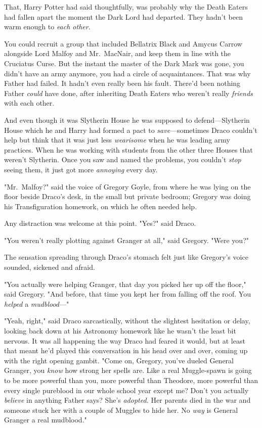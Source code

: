 That, Harry Potter had said thoughtfully, was probably why the Death Eaters had 
fallen apart the moment the Dark Lord had departed. They hadn't been warm 
enough to \emph{each other}.

You could recruit a group that included Bellatrix Black and Amycus Carrow 
alongside Lord Malfoy and Mr.~MacNair, and keep them in line with the Cruciatus 
Curse. But the instant the master of the Dark Mark was gone, you didn't have an 
army anymore, you had a circle of acquaintances. That was why Father had 
failed. It hadn't even really been his fault. There'd been nothing Father 
\emph{could} have done, after inheriting Death Eaters who weren't really 
\emph{friends} with each other.

And even though it was Slytherin House he was supposed to defend---Slytherin 
House which he and Harry had formed a pact to \emph{save}---sometimes Draco 
couldn't help but think that it was just less \emph{wearisome} when he was 
leading army practices. When he was working with students from the other three 
Houses that weren't Slytherin. Once you saw and named the problems, you 
couldn't \emph{stop} seeing them, it just got more \emph{annoying} every day.

"Mr.~Malfoy?" said the voice of Gregory Goyle, from where he was lying on the 
floor beside Draco's desk, in the small but private bedroom; Gregory was doing 
his Transfiguration homework, on which he often needed help.

Any distraction was welcome at this point. "Yes?" said Draco.

"You weren't really plotting against Granger at all," said Gregory. "Were you?"

The sensation spreading through Draco's stomach felt just like Gregory's voice 
sounded, sickened and afraid.

"You actually were helping Granger, that day you picked her up off the floor," 
said Gregory. "And before, that time you kept her from falling off the roof. 
You \emph{helped} a \emph{mudblood}---"

"Yeah, right," said Draco sarcastically, without the slightest hesitation or 
delay, looking back down at his Astronomy homework like he wasn't the least bit 
nervous. It was all happening the way Draco had feared it would, but at least 
that meant he'd played this conversation in his head over and over, coming up 
with the right opening gambit. "Come on, Gregory, you've dueled General 
Granger, you \emph{know} how strong her spells are. Like a real Muggle-spawn is 
going to be more powerful than you, more powerful than Theodore, more powerful 
than every single pureblood in our whole school year except me? Don't you 
actually \emph{believe} in anything Father says? She's \emph{adopted.} Her 
parents died in the war and someone stuck her with a couple of Muggles to hide 
her. No \emph{way} is General Granger a real mudblood."

